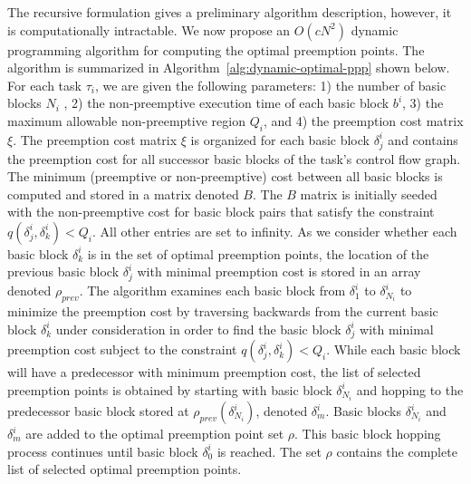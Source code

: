 \noindent
The recursive formulation gives a preliminary algorithm description, however, it is computationally intractable.  We now propose an \begin{math}O(cN^{2})\end{math} dynamic programming algorithm for computing the optimal preemption points.  The algorithm is summarized in Algorithm~\ref{alg:dynamic-optimal-ppp} shown below.  For each task $\tau_i$, we are given the following parameters: 1) the number of basic blocks $N_i$ , 2) the non-preemptive execution time of each basic block $b^i$, 3) the maximum allowable non-preemptive region $Q_i$, and 4) the preemption cost matrix $\xi$.  The preemption cost matrix $\xi$ is organized for each basic block \begin{math}\delta_{j}^{i}\end{math} and contains the preemption cost for all successor basic blocks of the task's control flow graph.  The minimum (preemptive or non-preemptive) cost between all basic blocks is computed and stored in a matrix denoted $B$.  The $B$ matrix is initially seeded with the non-preemptive cost for basic block pairs that satisfy the constraint $q(\delta_{j}^{i},\delta_{k}^{i}) < Q_{i}$. All other entries are set to infinity.  As we consider whether each basic block $\delta_{k}^{i}$ is in the set of optimal preemption points, the location of the previous basic block $\delta_{j}^{i}$ with minimal preemption cost is stored in an array denoted $\rho_{prev}$.  The algorithm examines each basic block from \begin{math}\delta_{1}^{i}\end{math} to \begin{math}\delta_{N_i}^{i}\end{math} to minimize the preemption cost by traversing backwards from the current basic block $\delta_{k}^{i}$ under consideration in order to find the basic block $\delta_{j}^{i}$ with minimal preemption cost subject to the constraint $q(\delta_{j}^{i},\delta_{k}^{i}) < Q_{i}$.  While each basic block will have a predecessor with minimum preemption cost, the list of selected preemption points is obtained by starting with basic block $\delta_{N_i}^{i}$ and hopping to the predecessor basic block stored at $\rho_{prev}(\delta_{N_i}^{i})$, denoted $\delta_{m}^{i}$.  Basic blocks $\delta_{N_i}^{i}$ and $\delta_{m}^{i}$ are added to the optimal preemption point set $\rho$.  This basic block hopping process continues until basic block $\delta_{0}^{i}$ is reached.  The set $\rho$ contains the complete list of selected optimal preemption points.

